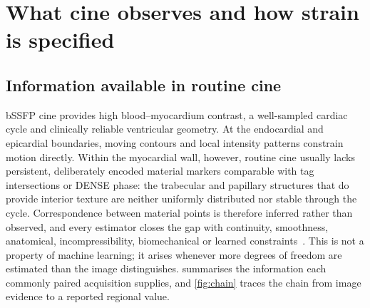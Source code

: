 \section{What cine observes and how strain is specified}\label{sec:observation}

\subsection{Information available in routine cine}\label{sec:observability}

bSSFP cine provides high blood--myocardium contrast, a well-sampled cardiac cycle and clinically
reliable ventricular geometry. At the endocardial and epicardial boundaries, moving contours and
local intensity patterns constrain motion directly. Within the myocardial wall, however, routine
cine usually lacks persistent, deliberately encoded material markers comparable with tag
intersections or DENSE phase: the trabecular and papillary structures that do provide interior
texture are neither uniformly distributed nor stable through the cycle. Correspondence between
material points is therefore inferred rather than observed, and every estimator closes the gap with
continuity, smoothness, anatomical, incompressibility, biomechanical or learned
constraints~\citep{pedrizzetti2016,duchateau2020}. This is not a property of machine learning; it
arises whenever more degrees of freedom are estimated than the image distinguishes.
 summarises the information each commonly paired acquisition supplies, and
\cref{fig:chain} traces the chain from image evidence to a reported regional value.

